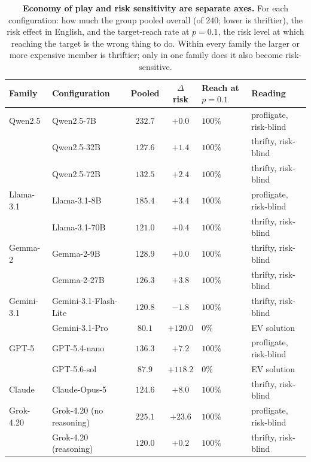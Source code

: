 \begin{table}[t]
\centering
\caption{\textbf{Economy of play and risk sensitivity are separate axes.} For each
configuration: how much the group pooled overall (of $240$; lower is thriftier), the
risk effect in English, and the target-reach rate at $p=0.1$, the risk level at which
reaching the target is the wrong thing to do. Within every family the larger or more
expensive member is thriftier; only in one family does it also become risk-sensitive.}
\label{tab:axes}
\small
\begin{tabular}{@{}llccll@{}}
\toprule
Family & Configuration & Pooled & $\Delta$ risk & Reach at $p{=}0.1$ & Reading \\
\midrule
Qwen2.5 & Qwen2.5-7B & $232.7$ & $+0.0$ & $100\%$ & profligate, risk-blind \\
 & Qwen2.5-32B & $127.6$ & $+1.4$ & $100\%$ & thrifty, risk-blind \\
 & Qwen2.5-72B & $132.5$ & $+2.4$ & $100\%$ & thrifty, risk-blind \\
\addlinespace[1pt]
Llama-3.1 & Llama-3.1-8B & $185.4$ & $+3.4$ & $100\%$ & profligate, risk-blind \\
 & Llama-3.1-70B & $121.0$ & $+0.4$ & $100\%$ & thrifty, risk-blind \\
\addlinespace[1pt]
Gemma-2 & Gemma-2-9B & $128.9$ & $+0.0$ & $100\%$ & thrifty, risk-blind \\
 & Gemma-2-27B & $126.3$ & $+3.8$ & $100\%$ & thrifty, risk-blind \\
\addlinespace[1pt]
Gemini-3.1 & Gemini-3.1-Flash-Lite & $120.8$ & $-1.8$ & $100\%$ & thrifty, risk-blind \\
 & Gemini-3.1-Pro & $80.1$ & $+120.0$ & $0\%$ & EV solution \\
\addlinespace[1pt]
GPT-5 & GPT-5.4-nano & $136.3$ & $+7.2$ & $100\%$ & profligate, risk-blind \\
 & GPT-5.6-sol & $87.9$ & $+118.2$ & $0\%$ & EV solution \\
\addlinespace[1pt]
Claude & Claude-Opus-5 & $124.6$ & $+8.0$ & $100\%$ & thrifty, risk-blind \\
\addlinespace[1pt]
Grok-4.20 & Grok-4.20 (no reasoning) & $225.1$ & $+23.6$ & $100\%$ & profligate, risk-blind \\
 & Grok-4.20 (reasoning) & $120.0$ & $+0.2$ & $100\%$ & thrifty, risk-blind \\
\bottomrule
\end{tabular}
\end{table}
